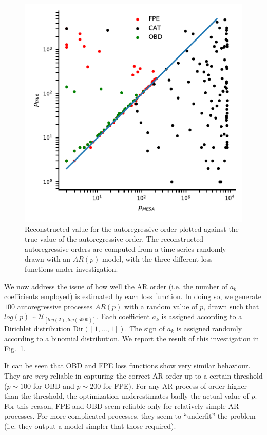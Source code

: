 \documentclass[twocolumn,showpacs,preprintnumbers,nofootinbib,prd,
superscriptaddress,10pt]{revtex4-1}
\begin{document}
\begin{figure}
	\centering
	\includegraphics[width = \linewidth]{Images/arp_errors/scatter_deltap_ptrue}
	\caption{Reconstructed value for the autoregressive order plotted against the true value of the autoregressive order.
	The reconstructed autoregressive orders are computed from a time series randomly drawn with an $AR(p)$ model, with the three different loss functions under investigation.
	}
	\label{fig:p_vs_ptrue}
\end{figure}

We now address the issue of how well the AR order (i.e. the number of $a_k$ coefficients employed) is estimated by each loss function.
In doing so, we generate $100$ autoregressive processes $AR(p)$ with a random value of $p$, drawn such that $log(p) \sim\mathcal{U}_{[log(2), log(5000)]}$.
Each coefficient $a_k$ is assigned according to a Dirichlet distribution $\mathrm{Dir}([1,\hdots, 1])$. The sign of $a_k$ is assigned randomly according to a binomial distribution. We report the result of this investigation in Fig.~\ref{fig:p_vs_ptrue}.

It can be seen that OBD and FPE loss functions show very similar behaviour. They are {\it very} reliable in capturing the correct AR order up to a certain threshold ($p\sim 100$ for OBD and $p\sim 200$ for FPE). For any AR process of order higher than the threshold, the optimization underestimates badly the actual value of $p$.
For this reason, FPE and OBD seem reliable only for relatively simple AR processes. For more complicated processes, they seem to ``underfit'' the problem (i.e. they output a model simpler that those required).
\end{document}
